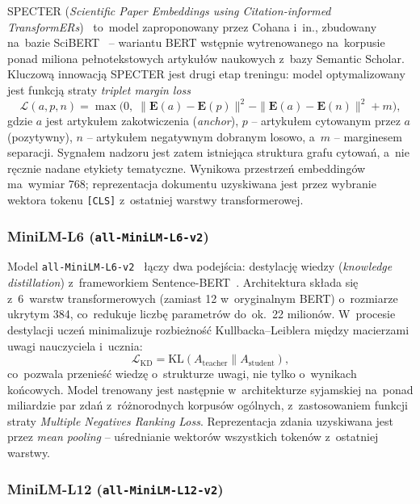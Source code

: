 SPECTER (\textit{Scientific Paper Embeddings using Citation-informed
TransformERs})~\cite{specter2020} to~model zaproponowany przez Cohana i~in.,
zbudowany na~bazie SciBERT~\cite{scibert2019} -- wariantu BERT
wstępnie wytrenowanego na~korpusie ponad miliona pełnotekstowych artykułów
naukowych z~bazy Semantic Scholar.
Kluczową innowacją SPECTER jest drugi etap treningu: model optymalizowany jest
funkcją straty \textit{triplet margin loss}
\begin{equation}
    \mathcal{L}(a,p,n) = \max\bigl(0,\;
        \|\mathbf{E}(a) - \mathbf{E}(p)\|^2 -
        \|\mathbf{E}(a) - \mathbf{E}(n)\|^2 + m\bigr),
\end{equation}
gdzie $a$ jest artykułem zakotwiczenia (\textit{anchor}),
$p$ -- artykułem cytowanym przez $a$ (pozytywny),
$n$ -- artykułem negatywnym dobranym losowo,
a~$m$ -- marginesem separacji.
Sygnałem nadzoru jest zatem istniejąca struktura grafu cytowań,
a~nie ręcznie nadane etykiety tematyczne.
Wynikowa przestrzeń embeddingów ma~wymiar 768;
reprezentacja dokumentu uzyskiwana jest przez wybranie wektora
tokenu \texttt{[CLS]} z~ostatniej warstwy transformerowej.

\subsubsection{MiniLM-L6 (\texttt{all-MiniLM-L6-v2})}

Model \texttt{all-MiniLM-L6-v2}~\cite{wang2020minilm} łączy dwa podejścia:
destylację wiedzy (\textit{knowledge distillation}) z~frameworkiem
Sentence-BERT~\cite{sbert2019}.
Architektura składa się z~6~warstw transformerowych
(zamiast 12 w~oryginalnym BERT) o~rozmiarze ukrytym 384,
co~redukuje liczbę parametrów do~ok.~22 milionów.
W~procesie destylacji uczeń minimalizuje rozbieżność Kullbacka--Leiblera
między macierzami uwagi nauczyciela i~ucznia:
\begin{equation}
    \mathcal{L}_{\mathrm{KD}} = \mathrm{KL}(A_{\mathrm{teacher}} \| A_{\mathrm{student}}),
\end{equation}
co~pozwala przenieść wiedzę o~strukturze uwagi, nie tylko o~wynikach końcowych.
Model trenowany jest następnie w~architekturze syjamskiej
na~ponad miliardzie par zdań z~różnorodnych korpusów ogólnych,
z~zastosowaniem funkcji straty \textit{Multiple Negatives Ranking Loss}.
Reprezentacja zdania uzyskiwana jest przez \textit{mean pooling}
-- uśrednianie wektorów wszystkich tokenów z~ostatniej warstwy.

\subsubsection{MiniLM-L12 (\texttt{all-MiniLM-L12-v2})}

